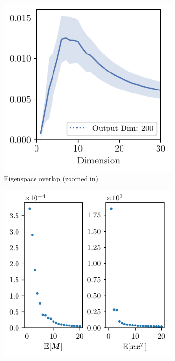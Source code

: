 \begin{figure}[H]
    \centering
    \begin{subfigure}[b]{0.24\textwidth}
        \centering
        \captionsetup{justification=centering}
        \includegraphics[width=\textwidth]{Appendix_Figures/Overlap_large_model/FailExplanation/VGGearly/DimOverlap_CIFAR10_VGG11W200_fxlr0.01_conv5_zoom.pdf}
        \caption{Eigenspace overlap (zoomed in)}
        \label{fig:app_adexp_vgg_ovlp}
    \end{subfigure}%
    \begin{subfigure}[b]{0.24\textwidth}
        \centering
        \captionsetup{justification=centering}
        \includegraphics[width=\textwidth]{Appendix_Figures/Overlap_large_model/FailExplanation/VGGearly/sigvals_t20_CIFAR10_Exp1_VGG11W200_fxlr0.01_E-1_features.11.pdf}

\end{subfigure}
\end{figure}
